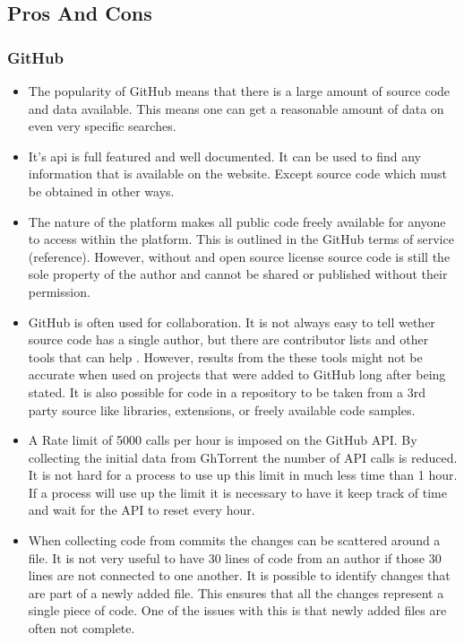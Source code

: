 \documentclass[12pt]{article}
\begin{document}
\subsection{Pros And Cons}
\subsubsection*{GitHub}
\begin{itemize}
    \item The popularity of GitHub means that there is a large amount of source code and data available. This means one can get a reasonable amount of data on even very specific searches.

    \item It's api is full featured and well documented. It can be used to find any information that is available on the website. Except source code which must be obtained in other ways.
    
    \item The nature of the platform makes all public code freely available for anyone to access within the platform. This is outlined in the GitHub terms of service (reference). However, without and open source license source code is still the sole property of the author and cannot be shared or published without their permission.

    \item GitHub is often used for collaboration. It is not always easy to tell wether source code has a single author, but there are contributor lists and other tools that can help \cite{Yang2017}\cite{Matyukhina2019}. However, results from the these tools might not be accurate when used on projects that were added to GitHub long after being stated. It is also possible for code in a repository to be taken from a 3rd party source like libraries, extensions, or freely available code samples.

    \item A Rate limit of 5000 calls per hour is imposed on the GitHub API. By collecting the initial data from GhTorrent the number of API calls is reduced. It is not hard for a process to use up this limit in much less time than 1 hour. If a process will use up the limit it is necessary to have it keep track of time and wait for the API to reset every hour.

    \item When collecting code from commits the changes can be scattered around a file. It is not very useful to have 30 lines of code from an author if those 30 lines are not connected to one another. It is possible to identify changes that are part of a newly added file. This ensures that all the changes represent a single piece of code. One of the issues with this is that newly added files are often not complete.
\end{itemize}
\end{document}
